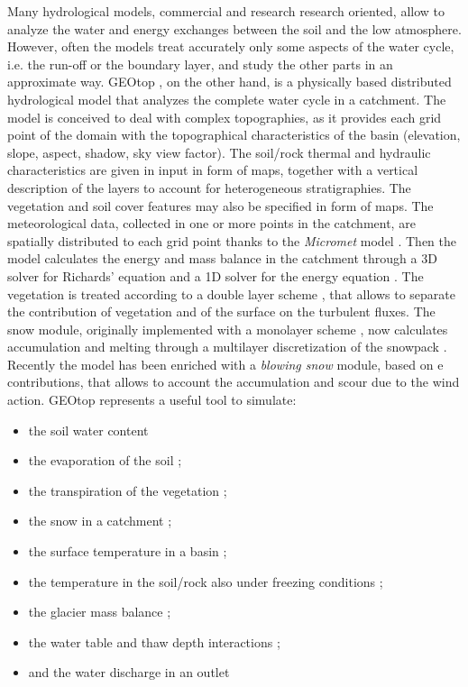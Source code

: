 Many hydrological models, commercial and research research oriented, allow to analyze the water and energy exchanges between the soil and the low atmosphere. However, often the models treat accurately only some aspects of the water cycle, i.e. the run-off or the boundary layer, and study the other parts in an approximate way.
GEOtop  \citep{Rigon06}, on the other hand, is a physically based distributed hydrological model that analyzes the complete water cycle in a catchment. The model is conceived to deal with complex topographies, as it provides each grid point of the domain with the topographical characteristics of the basin (elevation, slope, aspect, shadow, sky view factor). The soil/rock thermal and hydraulic characteristics are given in input in form of maps, together with a vertical description of the layers to account for heterogeneous stratigraphies. The vegetation and soil cover features may also be specified in form of maps.
The meteorological data, collected in one or more points in the catchment, are spatially distributed to each grid point thanks to the {\it Micromet} model \citep{liston2006meteorological}. 
Then the model calculates the energy and mass balance in the catchment through a 3D solver for Richards' equation \citep{EndrizziInvest2010} and a 1D solver for the energy equation \citep{dall2010energy}. 
The vegetation is treated according to a double layer scheme \citep{endrizzi2010observations}, that allows to separate the contribution of vegetation and of the surface on the turbulent fluxes.
The snow module, originally implemented with a monolayer scheme \citep{zanotti2004geotop}, now calculates accumulation and melting through a multilayer discretization of the snowpack \citep{endrizzi2007phd}. Recently the model has been enriched with a {\it blowing snow} module, based on \citet{pomeroy1993prairie} e \citet{essery1999distributed} contributions, that allows to account the accumulation and scour due to the wind action.
GEOtop represents a useful tool to simulate:
\begin{itemize}
\item the soil water content \citep{gebremichael2009scaling}
\item the evaporation of the soil \citep{Bertoldi2006, bertoldi2010topographical};
\item the transpiration of the vegetation \citep{endrizzi2010observations};
\item the snow in a catchment \citep{zanotti2004geotop, endrizzi2007phd, endrizzi2010observations, dallamico2011snow};
\item the surface temperature in a basin \citep{bertoldi2010topographical};
\item the temperature in the soil/rock also under freezing conditions \citep{dallamico2010phd};
\item the glacier mass balance \citep{NoldinNV2010};
\item the water table and thaw depth interactions \citep{EndrizziInvest2010};
\item and the water discharge in an outlet \citep{Rigon06}
\end{itemize}



